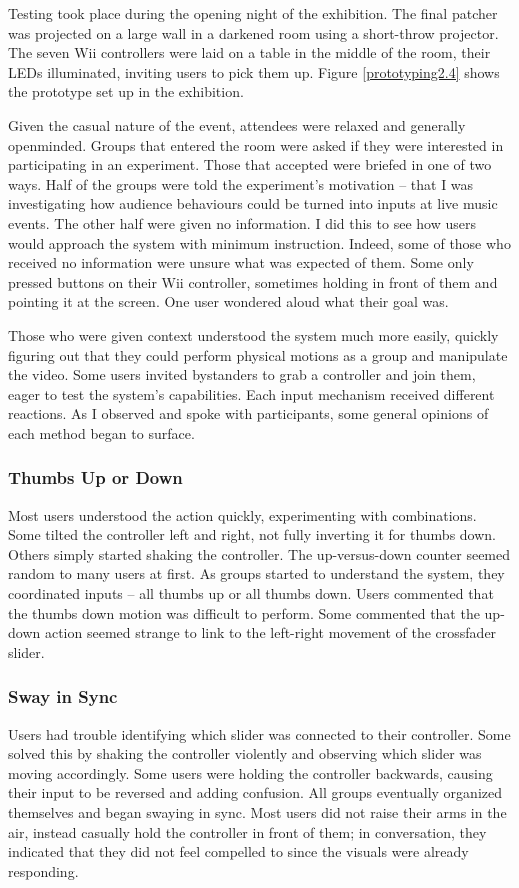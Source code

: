 Testing took place during the opening night of the exhibition. The final patcher was projected on a large wall in a darkened room using a short-throw projector. The seven Wii controllers were laid on a table in the middle of the room, their LEDs illuminated, inviting users to pick them up. Figure \ref{prototyping2.4} shows the prototype set up in the exhibition.

Given the casual nature of the event, attendees were relaxed and generally openminded. Groups that entered the room were asked if they were interested in participating in an experiment. Those that accepted were briefed in one of two ways. Half of the groups were told the experiment's motivation -- that I was investigating how audience behaviours could be turned into inputs at live music events. The other half were given no information. I did this to see how users would approach the system with minimum instruction. Indeed, some of those who received no information were unsure what was expected of them. Some only pressed buttons on their Wii controller, sometimes holding in front of them and pointing it at the screen. One user wondered aloud what their goal was.

Those who were given context understood the system much more easily, quickly figuring out that they could perform physical motions as a group and manipulate the video. Some users invited bystanders to grab a controller and join them, eager to test the system's capabilities. Each input mechanism received different reactions. As I observed and spoke with participants, some general opinions of each method began to surface.

\subsubsection{Thumbs Up or Down}
Most users understood the action quickly, experimenting with combinations. Some tilted the controller left and right, not fully inverting it for thumbs down. Others simply started shaking the controller. The up-versus-down counter seemed random to many users at first. As groups started to understand the system, they coordinated inputs -- all thumbs up or all thumbs down. Users commented that the thumbs down motion was difficult to perform. Some commented that the up-down action seemed strange to link to the left-right movement of the crossfader slider.

\subsubsection{Sway in Sync}
Users had trouble identifying which slider was connected to their controller. Some solved this by shaking the controller violently and observing which slider was moving accordingly. Some users were holding the controller backwards, causing their input to be reversed and adding confusion. All groups eventually organized themselves and began swaying in sync. Most users did not raise their arms in the air, instead casually hold the controller in front of them; in conversation, they indicated that they did not feel compelled to since the visuals were already responding.

